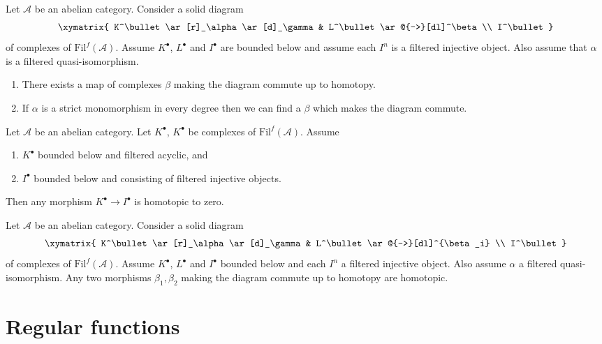 \begin{exercise}
\label{exercise-morphisms-lift}
Let $\mathcal{A}$ be an abelian category.
Consider a solid diagram
$$
\xymatrix{
K^\bullet \ar[r]_\alpha \ar[d]_\gamma & L^\bullet \ar@{-->}[dl]^\beta \\
I^\bullet
}
$$
of complexes of $\text{Fil}^f(\mathcal{A})$. Assume
$K^\bullet$, $L^\bullet$ and $I^\bullet$ are bounded below and
assume each $I^n$ is a filtered injective object.
Also assume that $\alpha$ is a filtered quasi-isomorphism.
\begin{enumerate}
\item There exists a map of complexes $\beta$ making the diagram
commute up to homotopy.
\item If $\alpha$ is a strict monomorphism in every degree
then we can find a $\beta$ which makes the diagram commute.
\end{enumerate}
\end{exercise}

\begin{exercise}
\label{exercise-acyclic-is-zero}
Let $\mathcal{A}$ be an abelian category.
Let $K^\bullet$, $K^\bullet$ be complexes of $\text{Fil}^f(\mathcal{A})$.
Assume
\begin{enumerate}
\item $K^\bullet$ bounded below and filtered acyclic, and
\item $I^\bullet$ bounded below and consisting of filtered injective objects.
\end{enumerate}
Then any morphism $K^\bullet \to I^\bullet$ is homotopic to zero.
\end{exercise}

\begin{exercise}
\label{exercise-morphisms-equal-up-to-homotopy}
Let $\mathcal{A}$ be an abelian category.
Consider a solid diagram
$$
\xymatrix{
K^\bullet \ar[r]_\alpha \ar[d]_\gamma & L^\bullet \ar@{-->}[dl]^{\beta_i} \\
I^\bullet
}
$$
of complexes of $\text{Fil}^f(\mathcal{A})$.
Assume $K^\bullet$, $L^\bullet$ and $I^\bullet$ bounded below and
each $I^n$ a filtered injective
object. Also assume $\alpha$ a filtered quasi-isomorphism.
Any two morphisms $\beta_1, \beta_2$ making the diagram commute
up to homotopy are homotopic.
\end{exercise}







\section{Regular functions}
\label{section-regular-functions}

